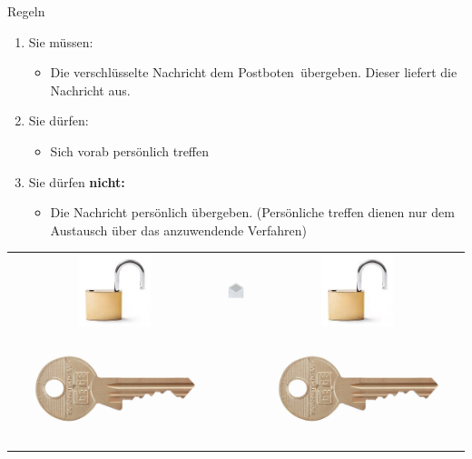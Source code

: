 \documentclass[11pt]{beamer}
\begin{document}
\begin{frame}{Regeln}
\begin{enumerate}
\item Sie müssen:
\begin{itemize}
\item Die verschlüsselte Nachricht dem \glqq Postboten\grqq\ übergeben. Dieser liefert die Nachricht aus.
\end{itemize}
\item Sie dürfen:
\begin{itemize}
\item Sich vorab persönlich treffen
\end{itemize}
\item Sie dürfen \textbf{nicht:}
\begin{itemize}
\item Die Nachricht persönlich übergeben. (Persönliche treffen dienen nur dem Austausch über das anzuwendende Verfahren)
\end{itemize}
\end{enumerate}
\begin{center}
\begin{tabular}{ccc}
\includegraphics[width=2.1cm,clip,trim=0cm .4cm 0cm 0cm]{schloss} & 
\includegraphics[width=2.1cm]{umschlag}&
\includegraphics[width=2.1cm,clip,trim=0cm .4cm 0cm 0cm]{schloss} \\
\hspace*{-.7cm}\includegraphics[angle=90,width=.8cm,clip,trim=1cm 2cm 30cm 2cm]{key}& &
\hspace*{-.7cm}\includegraphics[angle=90,width=.8cm,clip,trim=1cm 2cm 30cm 2cm]{key}
\end{tabular}
\end{center}
\end{frame}
\end{document}
